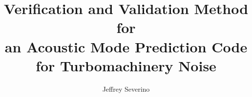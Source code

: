\documentclass[12pt]{uthesis-v12}  %
\begin{document}


\title{ Verification and Validation Method for 
\protect\\an Acoustic Mode Prediction Code for Turbomachinery Noise}

\author{Jeffrey Severino} 


\end{document}
